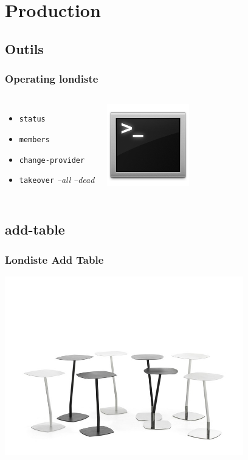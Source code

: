 \documentclass{beamer}
\begin{document}
\section{Production}
\subsection{Outils}

\begin{frame}[fragile]
  \frametitle{Operating londiste}

  \vfill

\begin{columns}[c]

  \begin{itemize}
    \item \texttt{status}
    \item \texttt{members}
    \item \texttt{change-provider}
    \item \texttt{takeover} \textit{--all} \textit{--dead}
  \end{itemize}

\begin{center}
  \includegraphics[height=1.4in]{TerminalIcon.png}
\end{center}
\end{columns}
\end{frame}

\subsection{add-table}

\begin{frame}[fragile]
  \frametitle{Londiste Add Table}

  \begin{center}
    \includegraphics[height=21em] {add-table.jpg}
  \end{center}
\end{frame}
\end{document}
